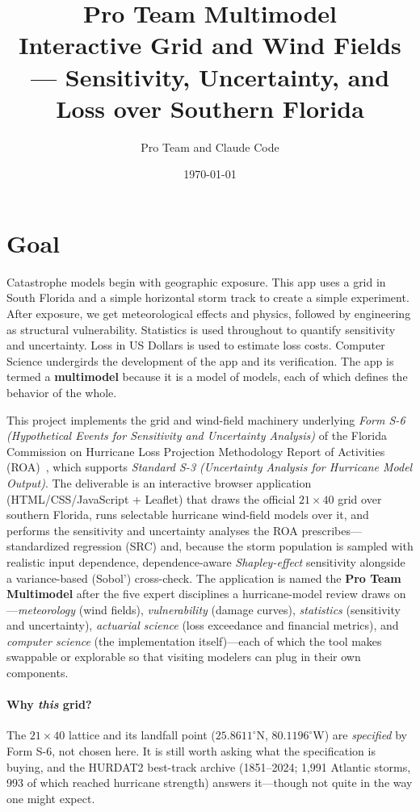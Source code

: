 \documentclass[11pt]{article}
\title{\textbf{Pro Team Multimodel}\\[2pt]
\large Interactive Grid and Wind Fields ---
Sensitivity, Uncertainty, and Loss over Southern Florida}
\author{Pro Team and Claude Code}
\date{\today}
\begin{document}
\maketitle

\tableofcontents
\bigskip

\section{Goal}
Catastrophe models begin with geographic exposure. This app uses a grid in South
Florida and a simple horizontal storm track to create a simple experiment. After
exposure, we get meteorological effects and physics, followed by engineering as
structural vulnerability. Statistics is used throughout to quantify sensitivity and
uncertainty. Loss in US Dollars is used to estimate loss costs. Computer Science
undergirds the development of the app and its verification. The app is termed a
\textbf{multimodel} because it is a model of models, each of which defines the
behavior of the whole.

This project implements the grid and wind-field machinery underlying
\emph{Form S-6 (Hypothetical Events for Sensitivity and Uncertainty Analysis)} of
the Florida Commission on Hurricane Loss Projection Methodology Report of
Activities (ROA)~\cite{fchlpm}, which supports \emph{Standard S-3 (Uncertainty Analysis for
Hurricane Model Output)}. The deliverable is an interactive browser application
(HTML/CSS/JavaScript + Leaflet) that draws the official $21\times40$ grid over
southern Florida, runs selectable hurricane wind-field models over it, and
performs the sensitivity and uncertainty analyses the ROA prescribes---standardized
regression (SRC) and, because the storm population is sampled with realistic input
dependence, dependence-aware \emph{Shapley-effect} sensitivity alongside a
variance-based (Sobol') cross-check.
The application is named the \textbf{Pro Team Multimodel} after the five expert
disciplines a hurricane-model review draws on---\emph{meteorology} (wind fields),
\emph{vulnerability} (damage curves), \emph{statistics} (sensitivity and
uncertainty), \emph{actuarial science} (loss exceedance and financial metrics), and
\emph{computer science} (the implementation itself)---each of which the tool makes
swappable or explorable so that visiting modelers can plug in their own components.

\paragraph{Why \emph{this} grid?} The $21\times40$ lattice and its landfall point
($25.8611^\circ$N, $80.1196^\circ$W) are \emph{specified} by Form S-6, not chosen
here. It is still worth asking what the specification is buying, and the HURDAT2
best-track archive (1851--2024; 1{,}991 Atlantic storms, 993 of which reached
hurricane strength) answers it---though not quite in the way one might expect.
\end{document}
